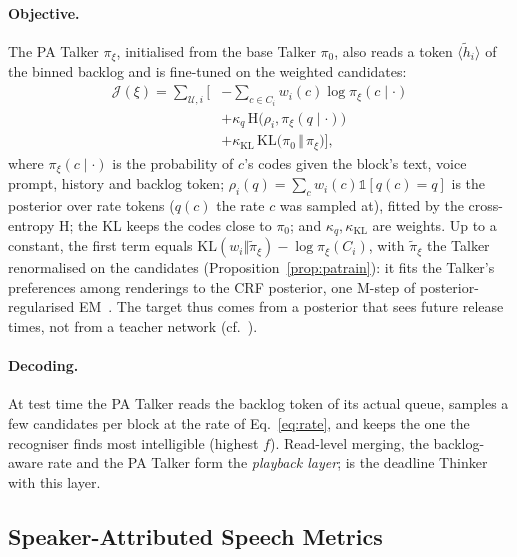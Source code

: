 \paragraph{Objective.} The PA Talker $\pi_\xi$, initialised from the base Talker $\pi_0$, also reads a token
$\langle\tilde h_i\rangle$ of the binned backlog and is fine-tuned on the weighted candidates:
\begin{equation}
\begin{aligned}
\mathcal{J}(\xi)=\textstyle\sum_{\mathcal{U},i}\Big[&-\textstyle\sum_{c\in C_i}w_i(c)\log\pi_\xi(c\mid\cdot)\\
&+\kappa_q\,\mathrm{H}\big(\rho_i,\pi_\xi(q\mid\cdot)\big)\\
&+\kappa_{\mathrm{KL}}\,\mathrm{KL}\big(\pi_0\,\Vert\,\pi_\xi\big)\Big],
\end{aligned}
\label{eq:patrain}
\end{equation}
where $\pi_\xi(c\mid\cdot)$ is the probability of $c$'s codes given the block's text, voice prompt, history and backlog
token; $\rho_i(q)=\sum_cw_i(c)\mathds{1}[q(c)=q]$ is the posterior over rate tokens ($q(c)$ the rate $c$ was sampled
at), fitted by the cross-entropy $\mathrm{H}$; the KL keeps the codes close to $\pi_0$; and $\kappa_q,\kappa_{\mathrm{KL}}$
are weights. Up to a constant, the first term equals $\mathrm{KL}(w_i\Vert\tilde\pi_\xi)-\log\pi_\xi(C_i)$, with
$\tilde\pi_\xi$ the Talker renormalised on the candidates (Proposition~\ref{prop:patrain}): it fits the Talker's
preferences among renderings to the CRF posterior, one M-step of posterior-regularised EM~\citep{ganchev2010posterior}.
The target thus comes from a posterior that sees future release times, not from a teacher network
(cf.~\citealp{hu2016harnessing}).

\paragraph{Decoding.} At test time the PA Talker reads the backlog token of its actual queue, samples a few
candidates per block at the rate of Eq.~\eqref{eq:rate}, and keeps the one the recogniser finds most intelligible
(highest $f$). Read-level merging, the backlog-aware rate and the PA Talker form the \emph{playback layer}; \sys{} is
the deadline Thinker with this layer.

\subsection{Speaker-Attributed Speech Metrics}
\label{sec:method-metrics}

